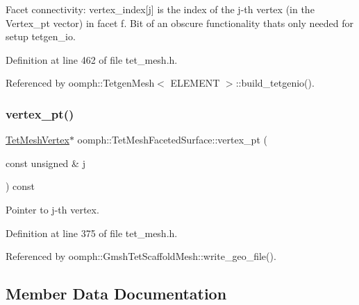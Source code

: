 Facet connectivity\+: vertex\+\_\+index\mbox{[}j\mbox{]} is the index of the j-\/th vertex (in the Vertex\+\_\+pt vector) in facet f. Bit of an obscure functionality that\textquotesingle{}s only needed for setup tetgen\+\_\+io. 



Definition at line 462 of file tet\+\_\+mesh.\+h.



Referenced by oomph\+::\+Tetgen\+Mesh$<$ E\+L\+E\+M\+E\+N\+T $>$\+::build\+\_\+tetgenio().

\mbox{\label{classoomph_1_1TetMeshFacetedSurface_accfd3cbc4b919518746db4a6a64f3344}} 
\subsubsection{\texorpdfstring{vertex\+\_\+pt()}{vertex\_pt()}}
{\footnotesize\ttfamily \hyperlink{classoomph_1_1TetMeshVertex}{Tet\+Mesh\+Vertex}$\ast$ oomph\+::\+Tet\+Mesh\+Faceted\+Surface\+::vertex\+\_\+pt (\begin{DoxyParamCaption}\item[{const unsigned \&}]{j }\end{DoxyParamCaption}) const\hspace{0.3cm}{\ttfamily [inline]}}



Pointer to j-\/th vertex. 



Definition at line 375 of file tet\+\_\+mesh.\+h.



Referenced by oomph\+::\+Gmsh\+Tet\+Scaffold\+Mesh\+::write\+\_\+geo\+\_\+file().



\subsection{Member Data Documentation}
\mbox{\label{classoomph_1_1TetMeshFacetedSurface_a0d42b95b2097482d25a727a0f6fd7605}} 
